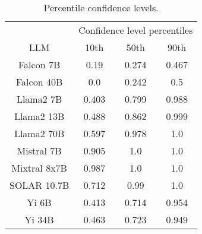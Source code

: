 \begin{table*}
\centering
\begin{tabular}{c|c|c|c}
& \multicolumn{3}{c}{Confidence level percentiles} \\ 
LLM & 10th & 50th & 90th\\ \hline
Falcon 7B & 0.19 & 0.274 & 0.467\\
Falcon 40B & 0.0 & 0.242 & 0.5\\
Llama2 7B & 0.403 & 0.799 & 0.988\\
Llama2 13B & 0.488 & 0.862 & 0.999\\
Llama2 70B & 0.597 & 0.978 & 1.0\\
Mistral 7B & 0.905 & 1.0 & 1.0\\
Mixtral 8x7B & 0.987 & 1.0 & 1.0\\
SOLAR 10.7B & 0.712 & 0.99 & 1.0\\
Yi 6B & 0.413 & 0.714 & 0.954\\
Yi 34B & 0.463 & 0.723 & 0.949\\
\hline
\end{tabular}
\caption{Percentile confidence levels.}
\label{tab:percentile_conf}
\end{table*}
